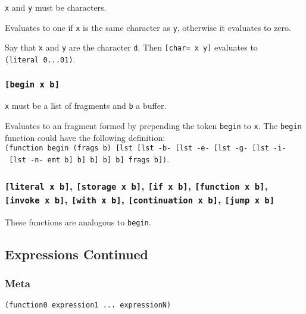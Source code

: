 \documentclass[]{article}
\begin{document}
\texttt{x} and \texttt{y} must be characters.

Evaluates to one if \texttt{x} is the same character as \texttt{y},
otherwise it evaluates to zero.

Say that \texttt{x} and \texttt{y} are the character \texttt{d}. Then
\texttt{{[}char=\ x\ y{]}} evaluates to \texttt{(literal\ 0...01)}.

\subsubsection{\texorpdfstring{\texttt{{[}begin\ x\ b{]}}}{{[}begin x b{]}}}\label{begin-x-b}

\texttt{x} must be a list of fragments and \texttt{b} a buffer.

Evaluates to an fragment formed by prepending the token \texttt{begin}
to \texttt{x}. The \texttt{begin} function could have the following
definition:
\texttt{(function\ begin\ (frags\ b)\ {[}lst\ {[}lst\ -b-\ {[}lst\ -e-\ {[}lst\ -g-\ {[}lst\ -i-\ {[}lst\ -n-\ emt\ b{]}\ b{]}\ b{]}\ b{]}\ b{]}\ frags\ b{]})}.

\subsubsection{\texorpdfstring{\texttt{{[}literal\ x\ b{]}},
\texttt{{[}storage\ x\ b{]}}, \texttt{{[}if\ x\ b{]}},
\texttt{{[}function\ x\ b{]}}, \texttt{{[}invoke\ x\ b{]}},
\texttt{{[}with\ x\ b{]}}, \texttt{{[}continuation\ x\ b{]}},
\texttt{{[}jump\ x\ b{]}}}{{[}literal x b{]}, {[}storage x b{]}, {[}if x b{]}, {[}function x b{]}, {[}invoke x b{]}, {[}with x b{]}, {[}continuation x b{]}, {[}jump x b{]}}}\label{literal-x-b-storage-x-b-if-x-b-function-x-b-invoke-x-b-with-x-b-continuation-x-b-jump-x-b}

These functions are analogous to \texttt{begin}.

\subsection{Expressions Continued}\label{expressions-continued}

\hypertarget{meta}{\subsubsection{Meta}\label{meta}}

\begin{verbatim}
(function0 expression1 ... expressionN)
\end{verbatim}
\end{document}
